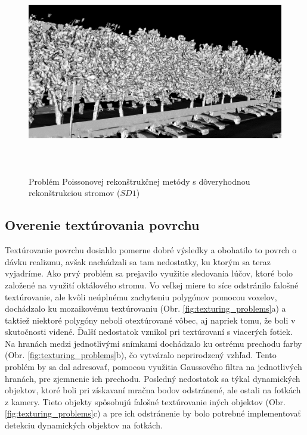 \begin{figure}[!htbp]
  \centering
  \includegraphics[width=16cm, height=9cm]{img/tree_mesh.png}
  \caption{Problém Poissonovej rekonštrukčnej metódy s dôveryhodnou rekonštrukciou stromov  ($SD1$)} 
  \label{fig:tree_mesh}
\end{figure} 

\subsection{Overenie textúrovania povrchu}
\noindent Textúrovanie povrchu dosiahlo pomerne dobré výsledky a obohatilo to povrch o dávku realizmu, avšak nachádzali sa tam nedostatky, ku ktorým sa teraz vyjadríme. 
\newline\indent Ako prvý problém sa prejavilo využitie sledovania lúčov, ktoré bolo založené na využití oktálového stromu. Vo veľkej miere to síce odstránilo falošné textúrovanie, ale kvôli neúplnému zachyteniu polygónov pomocou voxelov, dochádzalo ku mozaikovému textúrovaniu (Obr. \ref{fig:texturing_problems}a) a taktiež niektoré polygóny neboli otextúrované vôbec, aj napriek tomu, že boli v skutočnosti videné.
\newline\indent Ďalší nedostatok vznikol pri textúrovaní s viacerých fotiek. Na hranách medzi jednotlivými snímkami dochádzalo ku ostrému prechodu farby (Obr. \ref{fig:texturing_problems}b), čo vytváralo neprirodzený vzhľad. Tento problém by sa dal adresovať, pomocou využitia Gaussového filtra na jednotlivých hranách, pre zjemnenie ich prechodu.
\newline\indent Posledný nedostatok sa týkal dynamických objektov, ktoré boli pri získavaní mračna bodov odstránené, ale ostali na fotkách z kamery. Tieto objekty spôsobujú falošné textúrovanie iných objektov (Obr. \ref{fig:texturing_problems}c) a pre ich odstránenie by bolo potrebné implementovať detekciu dynamických objektov na fotkách. 

